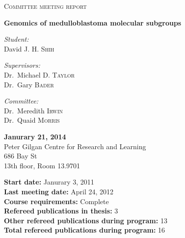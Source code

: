 \begin{titlepage}

\setlength{\topmargin}{30mm}

\begin{center}
 
\textsc{\Large Committee meeting report}\bigskip

{\huge \bfseries Genomics of medulloblastoma molecular subgroups}\\[10mm]

\begin{minipage}{0.6\textwidth}
\begin{multicols}{2}
	\begin{flushleft}
		\large \emph{Student:}\\
		David J. H. \textsc{Shih}
	\end{flushleft}
	\vfill
	\columnbreak
	\begin{flushright}
		\large \emph{Supervisors:}\\
		Dr.~Michael D. \textsc{Taylor}\\
		Dr.~Gary \textsc{Bader}\\
	\end{flushright}
	\begin{flushright}
		\large \emph{Committee:}\\
		Dr.~Meredith \textsc{Irwin}\\
		Dr.~Quaid \textsc{Morris}
	\end{flushright}
\end{multicols}
\end{minipage}

\vspace{20mm}

{ \large 
\textbf{Janurary 21, 2014}\\
\medskip
Peter Gilgan Centre for Research and Learning\\
686 Bay St\\
13th floor, Room 13.9701
}

\vspace{40mm}

\begin{flushleft}
	{ \large
	\textbf{Start date:} Janurary 3, 2011\\
	\textbf{Last meeting date:} April 24, 2012\\
	\medskip
	\textbf{Course requirements:} Complete\\
	\medskip
	\textbf{Refereed publications in thesis:} 3\\
	\textbf{Other refereed publications during program:} 13\\
	\textbf{Total refereed publications during program:} 16\\
	}
\end{flushleft}


\end{center}

\end{titlepage}

